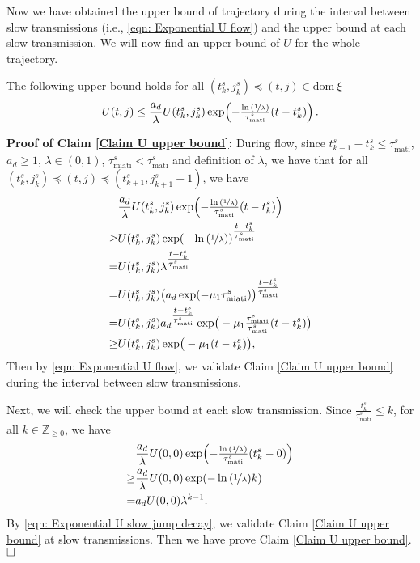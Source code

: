 Now we have obtained the upper bound of trajectory during the interval between slow transmissions (i.e., \eqref{eqn: Exponential U flow}) and the upper bound at each slow transmission. We will now find an upper bound of $U$ for the whole trajectory.
\begin{claim}
    The following upper bound holds for all $(t_k^s, j_k^s) \preceq (t,j) \in \text{dom}\ \xi$
    \begin{equation*}
        U(t,j) \leq \frac{a_d}{\lambda}U(t_k^s,j_k^s)  \exp \!\left(-\tfrac{\ln{(\nicefrac{1}{\lambda})}}{\tau_{\text{mati}}^s}(t-t_k^s) \right). 
    \end{equation*}
    \label{Claim U upper bound}
\end{claim}
\textbf{Proof of Claim \ref{Claim U upper bound}:}
During flow, since $t_{k+1}^s - t_k^s \leq \tau_{\text{mati}}^s$, $a_d \geq 1$, $\lambda \in (0,1)$, $\tau_{\text{miati}}^s < \tau_{\text{mati}}^s$ and definition of $\lambda$, we have that for all $(t_k^s, j_k^s) \preceq (t,j) \preceq (t_{k+1}^s, j_{k+1}^s-1)$, we have
\begin{equation*}
    \begin{aligned}
        &\frac{a_d}{\lambda}U(t_k^s,j_k^s)  \exp \!\left(-\tfrac{\ln{(\nicefrac{1}{\lambda})}}{\tau_{\text{mati}}^s}(t-t_k^s) \right) \\
        \geq & U(t_k^s,j_k^s) \exp \!\left( -\ln{(\nicefrac{1}{\lambda})}\right)^{\tfrac{t-t_k^s}{\tau_{\text{mati}}^s}} \\
        = & U(t_k^s,j_k^s) \lambda^{\tfrac{t-t_k^s}{\tau_{\text{mati}}^s}} \\
        = &  U(t_k^s,j_k^s) \big(a_d \exp (-\mu_1 \tau_{\text{miati}}^s) \big)^{\tfrac{t-t_k^s}{\tau_{\text{mati}}^s}} \\
        = & U(t_k^s,j_k^s) {a_d}^{\tfrac{t-t_k^s}{\tau_{\text{mati}}^s}} \exp \! \big(-\mu_1 \tfrac{\tau_{\text{miati}}^s}{\tau_{\text{mati}}^s} (t - t_k^s)\big) \\
        \geq & U(t_k^s,j_k^s)\exp\!\big(-\mu_1 (t - t_k^s)\big) ,
    \end{aligned}
\end{equation*}
Then by \eqref{eqn: Exponential U flow}, we validate Claim \ref{Claim U upper bound} during the interval between slow transmissions. 

Next, we will check the upper bound at each slow transmission. Since $\tfrac{t_k^s}{\tau_{\text{mati}}^s} \leq k$, for all $k\in \mathbb{Z}_{\geq 0}$, we have 
\begin{equation*}
    \begin{aligned}
        & \frac{a_d}{\lambda}U(0,0)  \exp \!\left(-\tfrac{\ln{(\nicefrac{1}{\lambda})}}{\tau_{\text{mati}}^s}(t_k^s-0) \right) \\
        \geq & \frac{a_d}{\lambda}U(0,0)  \exp \!\left(-\ln{(\nicefrac{1}{\lambda})} k \right) \\
        = & a_d U(0,0) \lambda^{k-1}.
    \end{aligned}
\end{equation*}
 By \eqref{eqn: Exponential U slow jump decay}, we validate Claim \ref{Claim U upper bound} at slow transmissions. Then we have prove Claim \ref{Claim U upper bound}. $\hfill\square$

